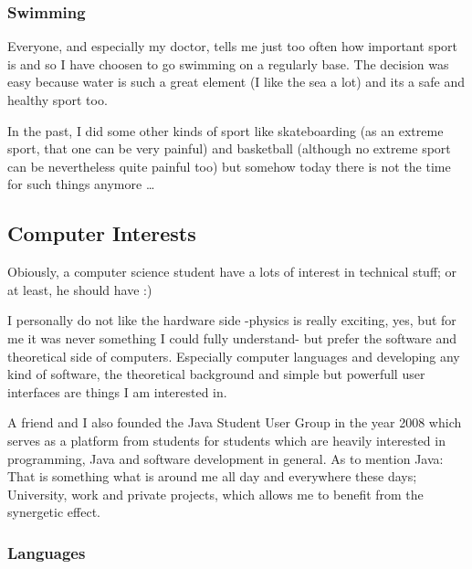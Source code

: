 \subsubsection{Swimming}

Everyone, and especially my doctor, tells me just too often how important sport
is and so I have choosen to go swimming on a regularly base. The decision was
easy because water is such a great element (I like the sea a lot) and its a
safe and healthy sport too.

In the past, I did some other kinds of sport like skateboarding (as an extreme
sport, that one can be very painful) and basketball (although no extreme sport
can be nevertheless quite painful too) but somehow today there is not the time
for such things anymore \ldots




\subsection{Computer Interests}


Obiously, a computer science student have a lots of interest in technical
stuff; or at least, he should have :)

I personally do not like the hardware side -physics is really exciting,
yes, but for me it was never something I could fully understand- but prefer the
software and theoretical side of computers. Especially computer languages and
developing any kind of software, the theoretical background and simple but
powerfull user interfaces are things I am interested in.

A friend and I also founded the Java Student User Group \cite{jsug} in the year
2008 which serves as a platform from students for students which are heavily
interested in programming, Java and software development in general. As to
mention Java: That is something what is around me all day and everywhere these
days; University, work and private projects, which allows me to benefit
from the synergetic effect.


\subsubsection{Languages}


